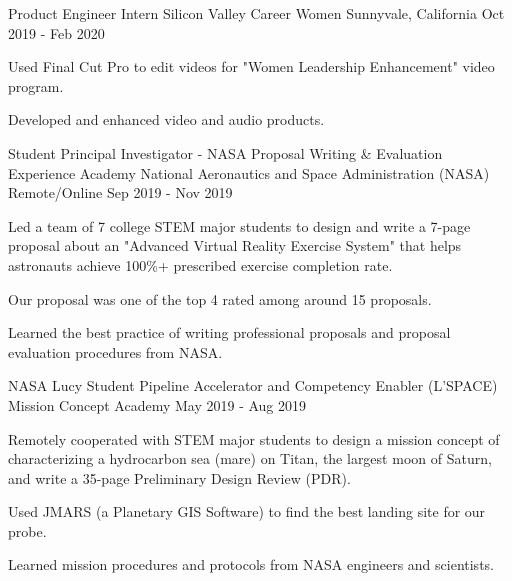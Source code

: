 

\begin{cventries}

  \cventry
    {Product Engineer Intern} %
    {Silicon Valley Career Women} %
    {Sunnyvale, California} %
    {Oct 2019 - Feb 2020} %
    {
	\begin{cvitems} %
      	\item Used Final Cut Pro to edit videos for "Women Leadership Enhancement" video program.
      	\item Developed and enhanced video and audio products.
	\end{cvitems}
    }
    
  \cventry
    {Student Principal Investigator - NASA Proposal Writing \& Evaluation Experience Academy} %
    {National Aeronautics and Space Administration (NASA)} %
    {Remote/Online} %
    {Sep 2019 - Nov 2019} %
    {
	\begin{cvitems} %
      	\item Led a team of 7 college STEM major students to design and write a 7-page proposal about an "Advanced Virtual Reality Exercise System" that helps astronauts achieve 100\%+ prescribed exercise completion rate. 
      	\item Our proposal was one of the top 4 rated among around 15 proposals.
      	\item Learned the best practice of writing professional proposals and proposal evaluation procedures from NASA.
	\end{cvitems}
    }
   
   \cventry
    {NASA Lucy Student Pipeline Accelerator and Competency Enabler (L'SPACE) Mission Concept Academy} %
    {} %
    {} %
    {May 2019 - Aug 2019} %
    {
	\begin{cvitems} %
      	\item Remotely cooperated with STEM major students to design a mission concept of characterizing a hydrocarbon sea (mare) on Titan, the largest moon of Saturn, and write a 35-page Preliminary Design Review (PDR). 
      	\item Used JMARS (a Planetary GIS Software) to find the best landing site for our probe.
      	\item Learned mission procedures and protocols from NASA engineers and scientists.
	\end{cvitems}
    }
    

\end{cventries}
